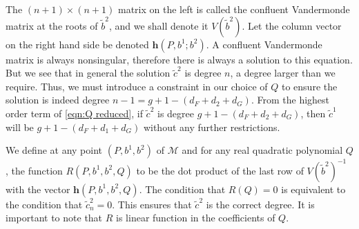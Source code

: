 The $(n+1)\times (n+1)$ matrix on the left is called the confluent Vandermonde matrix at the roots of $\tilde{b}^2$, and we shall denote it $V(\tilde{b}^2)$. Let the column vector on the right hand side be denoted $\mathbf{h}(P,b^1;b^2)$. A confluent Vandermonde matrix is always nonsingular, therefore there is always a solution to this equation. But we see that in general the solution $\tilde{c}^2$ is degree $n$, a degree larger than we require. Thus, we must introduce a constraint in our choice of $Q$ to ensure the solution is indeed degree $n-1 = g + 1 - (d_F + d_2 + d_G)$. From the highest order term of \eqref{eqn:Q reduced}, if $\tilde{c}^2$ is degree $g + 1 - (d_F + d_2 + d_G)$, then $\tilde{c}^1$ will be $g + 1 - (d_F + d_1 + d_G)$ without any further restrictions.

We define at any point $(P,b^1,b^2)$ of $\mathcal{M}$ and for any real quadratic polynomial $Q$, the function $R(P,b^1,b^2,Q)$ to be the dot product of the last row of $V(\tilde{b}^2)^{-1}$ with the vector $\mathbf{h}(P,b^1,b^2,Q)$. The condition that $R(Q) = 0$ is equivalent to the condition that $\tilde{c}^2_n=0$. This ensures that $\tilde{c}^2$ is the correct degree. It is important to note that $R$ is linear function in the coefficients of $Q$.

